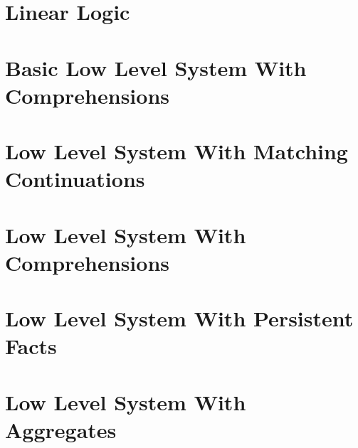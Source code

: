 \documentclass[9pt]{article}
\begin{document}
\section{Linear Logic}


\begin{comment}
\section{Optimization Ideas}

\end{comment}


%

\newcommand{\mz}{\m{match} \;}
\newcommand{\mo}{\m{m}_1 \;}
\newcommand{\dz}{\m{derive} \;}
\newcommand{\done}{\m{d}_1 \;}
\newcommand{\az}{\m{a}_0 \;}
\newcommand{\ao}{\m{a}_1 \;}
\newcommand{\doz}{\m{do}_0 \;}
\newcommand{\doo}{\m{do}_1 \;}
\newcommand{\cont}{\m{cont} \;}
\newcommand{\contc}{\m{contc} \;}
\newcommand{\dc}{\m{dc} \;}

\section{Basic Low Level System With Comprehensions}



\section{Low Level System With Matching Continuations}


\section{Low Level System With Comprehensions}


\section{Low Level System With Persistent Facts}


\section{Low Level System With Aggregates}

\end{document}
